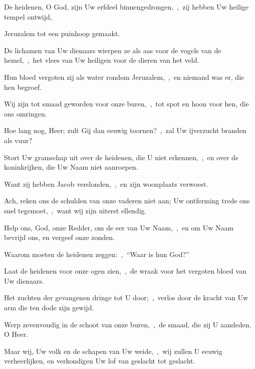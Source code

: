 \documentclass[12pt,twoside,a5paper]{article}
\begin{document}



\begin{halfparskip}
  De heidenen, O God, zijn Uw erfdeel binnengedrongen,~\sep\ zij hebben Uw heilige tempel ontwijd,


  Jeruzalem tot een puinhoop gemaakt.

  De lichamen van Uw dienaars wierpen ze als aas voor de vogels van de hemel,~\sep\ het vlees van Uw heiligen voor de dieren van het veld.

  Hun bloed vergoten zij als water rondom Jeruzalem,~\sep\ en niemand was er, die hen begroef.

  Wij zijn tot smaad geworden voor onze buren,~\sep\ tot spot en hoon voor hen, die ons omringen.
\end{halfparskip}


\begin{halfparskip}
  Hoe lang nog, Heer; zult Gij dan eeuwig toornen?~\sep\ zal Uw ijverzucht branden als vuur?

  Stort Uw gramschap uit over de heidenen, die U niet erkennen,~\sep\ en over de koninkrijken, die Uw Naam niet aanroepen.

  Want zij hebben Jacob verslonden,~\sep\ en zijn woonplaats verwoest.

  Ach, reken ons de schulden van onze vaderen niet aan; Uw ontferming trede ons snel tegemoet,~\sep\ want wij zijn uiterst ellendig.
\end{halfparskip}


\begin{halfparskip}
  Help ons, God, onze Redder, om de eer van Uw Naam,~\sep\ en om Uw Naam bevrijd ons, en vergeef onze zonden.

  Waarom moeten de heidenen zeggen:~\sep\ ``Waar is hun God?''

  Laat de heidenen voor onze ogen zien,~\sep\ de wraak voor het vergoten bloed van Uw dienaars.

  Het zuchten der gevangenen dringe tot U door;~\sep\ verlos door de kracht van Uw arm die ten dode zijn gewijd.

  Werp zevenvoudig in de schoot van onze buren,~\sep\ de smaad, die zij U aandeden, O Heer.

  Maar wij, Uw volk en de schapen van Uw weide,~\sep\ wij zullen U eeuwig verheerlijken, en verkondigen Uw lof van geslacht tot geslacht.
\end{halfparskip}
\end{document}
